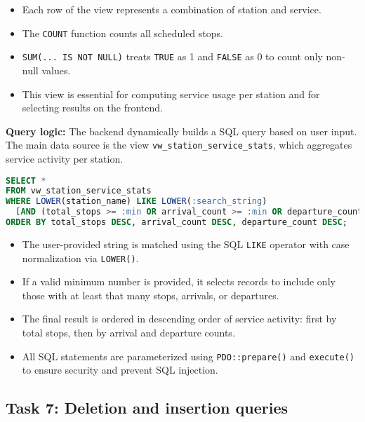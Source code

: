 \documentclass[a4paper, 12pt]{article}
\begin{document}
\begin{itemize}
    \item Each row of the view represents a combination of station and service.
    \item The \texttt{COUNT} function counts all scheduled stops.
    \item \texttt{SUM(... IS NOT NULL)} treats \texttt{TRUE} as 1 and \texttt{FALSE} as 0 to count only non-null values.
    \item This view is essential for computing service usage per station and for selecting results on the frontend.
\end{itemize}


\textbf{Query logic:} The backend dynamically builds a SQL query based on user input. The main data source is the view \texttt{vw\_station\_service\_stats}, which aggregates service activity per station.

\begin{lstlisting}[language=SQL]
SELECT * 
FROM vw_station_service_stats
WHERE LOWER(station_name) LIKE LOWER(:search_string)
  [AND (total_stops >= :min OR arrival_count >= :min OR departure_count >= :min)]
ORDER BY total_stops DESC, arrival_count DESC, departure_count DESC;
\end{lstlisting}

\begin{itemize}
    \item The user-provided string is matched using the SQL \texttt{LIKE} operator with case normalization via \texttt{LOWER()}.
    \item If a valid minimum number is provided, it selects records to include only those with at least that many stops, arrivals, or departures.
    \item The final result is ordered in descending order of service activity: first by total stops, then by arrival and departure counts.
    \item All SQL statements are parameterized using \texttt{PDO::prepare()} and \texttt{execute()} to ensure security and prevent SQL injection.
\end{itemize}



% 
\newpage
\subsection{Task 7: Deletion and insertion queries}
\end{document}
